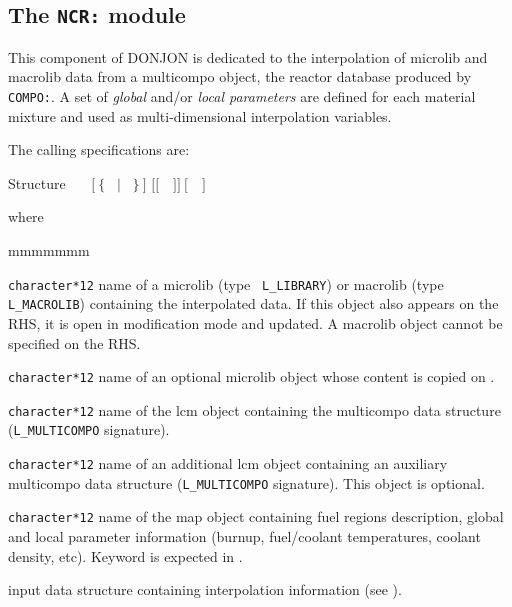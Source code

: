 \subsection{The {\tt NCR:} module}\label{sect:NCRData}

This component of DONJON is dedicated to the interpolation of {\sc microlib} and
{\sc macrolib} data from a {\sc multicompo} object, the reactor database produced by {\tt COMPO:}.
A set of {\sl global} and/or {\sl local parameters} are defined for each material mixture and
used as multi-dimensional interpolation variables.

\vskip 0.02cm

The calling specifications are:

\begin{DataStructure}{Structure }
~\moc{:=}~~$[~\{$~ $|$ ~$\}~]$  $[[$~~$]]~[$~~$]$~\moc{::}~ \\
\end{DataStructure}

\noindent where
\begin{ListeDeDescription}{mmmmmmm}

\item[\dusa{MLIB}] {\tt character*12} name of a {\sc microlib} (type {\tt
L\_LIBRARY}) or {\sc macrolib} (type {\tt L\_MACROLIB}) containing the interpolated data. If this object also appears on the RHS, it is open in modification mode and updated. A {\sc macrolib} object cannot be specified on the RHS.

\item[\dusa{MLIB2}] {\tt character*12} name of an optional {\sc microlib} object whose content is copied on .

\item[\dusa{CPONAM1}] {\tt character*12} name of the {\sc lcm} object containing the
{\sc multicompo} data structure ({\tt L\_MULTICOMPO} signature).

\item[\dusa{CPONAM2}] {\tt character*12} name of an additional {\sc lcm} object containing an auxiliary
{\sc multicompo} data structure ({\tt L\_MULTICOMPO} signature). This object is optional.

\item[\dusa{MAPFL}] {\tt character*12} name of the {\sc map} object containing fuel regions description, global and local parameter
information (burnup, fuel/coolant temperatures, coolant density, etc). Keyword  is expected in .

\item[\dusa{ncr\_data}] input data structure containing interpolation information (see ).

\end{ListeDeDescription}

